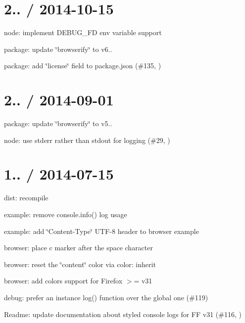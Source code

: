 \section*{2.. / 2014-\/10-\/15 }


\begin{DoxyItemize}
\item node\+: implement {\ttfamily D\+E\+B\+U\+G\+\_\+\+FD} env variable support
\item package\+: update \char`\"{}browserify\char`\"{} to v6..
\item package\+: add \char`\"{}license\char`\"{} field to package.\+json (\#135, )
\end{DoxyItemize}

\section*{2.. / 2014-\/09-\/01 }


\begin{DoxyItemize}
\item package\+: update \char`\"{}browserify\char`\"{} to v5..
\item node\+: use stderr rather than stdout for logging (\#29, )
\end{DoxyItemize}

\section*{1.. / 2014-\/07-\/15 }


\begin{DoxyItemize}
\item dist\+: recompile
\item example\+: remove {\ttfamily console.\+info()} log usage
\item example\+: add \char`\"{}\+Content-\/\+Type\char`\"{} U\+T\+F-\/8 header to browser example
\item browser\+: place c marker after the space character
\item browser\+: reset the \char`\"{}content\char`\"{} color via {\ttfamily color\+: inherit}
\item browser\+: add colors support for Firefox $>$= v31
\item debug\+: prefer an instance {\ttfamily log()} function over the global one (\#119)
\item Readme\+: update documentation about styled console logs for FF v31 (\#116, )
\end{DoxyItemize}

